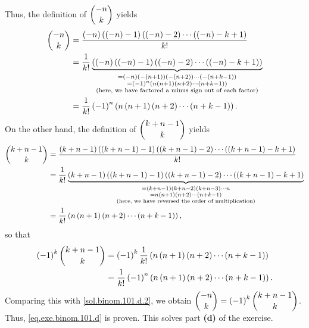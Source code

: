 \documentclass[paper=a4, fontsize=12pt]{scrartcl} %
\newcommand{\tup}[1]{\left( #1 \right)}
\newcommand{\underbrack}[2]{\underbrace{#1}_{\substack{#2}}}
\theoremstyle{plainsl}
\theoremstyle{definition}
\theoremstyle{remark}
\begin{document}
Thus, the definition of $\dbinom{-n}{k}$ yields
\begin{align}
   \dbinom{-n}{k}
&= \dfrac{ \tup{-n} \tup{\tup{-n}-1} \tup{\tup{-n}-2} \cdots \tup{\tup{-n}-k+1} }{k!} \nonumber\\
&= \dfrac{1}{k!}
    \underbrack{\tup{ \tup{-n} \tup{\tup{-n}-1} \tup{\tup{-n}-2} \cdots \tup{\tup{-n}-k+1} }}
               {= \tup{-n} \tup{-\tup{n+1}} \tup{-\tup{n+2}} \cdots \tup{-\tup{n+k-1}} \\
                = \tup{-1}^n \tup{ n \tup{n+1} \tup{n+2} \cdots \tup{n+k-1} } \\
                \text{(here, we have factored a minus sign out of each factor)}} \nonumber \\
&= \dfrac{1}{k!} \tup{-1}^n \tup{ n \tup{n+1} \tup{n+2} \cdots \tup{n+k-1} }.
\label{sol.binom.101.d.2}
\end{align}
On the other hand, the definition of $\dbinom{k + n - 1}{k}$ yields
\begin{align*}
   \dbinom{k + n - 1}{k}
&= \dfrac{ \tup{k+n-1} \tup{\tup{k+n-1}-1} \tup{\tup{k+n-1}-2} \cdots \tup{\tup{k+n-1}-k+1} }{k!} \\
&= \dfrac{1}{k!}
    \underbrack{ \tup{k+n-1} \tup{\tup{k+n-1}-1} \tup{\tup{k+n-1}-2} \cdots \tup{\tup{k+n-1}-k+1} }
               {= \tup{k+n-1} \tup{k+n-2} \tup{k+n-3} \cdots n \\
                = n \tup{n+1} \tup{n+2} \cdots \tup{n+k-1} \\
                \text{(here, we have reversed the order of multiplication)}} \\
&= \dfrac{1}{k!} \tup{ n \tup{n+1} \tup{n+2} \cdots \tup{n+k-1} } ,
\end{align*}
so that
\begin{align*}
   \tup{-1}^k \dbinom{k + n - 1}{k}
&= \tup{-1}^k \dfrac{1}{k!} \tup{ n \tup{n+1} \tup{n+2} \cdots \tup{n+k-1} } \\
&= \dfrac{1}{k!} \tup{-1}^n \tup{ n \tup{n+1} \tup{n+2} \cdots \tup{n+k-1} }.
\end{align*}
Comparing this with \eqref{sol.binom.101.d.2}, we obtain
$\dbinom{-n}{k} = \tup{-1}^k \dbinom{k + n - 1}{k}$.
Thus, \eqref{eq.exe.binom.101.d} is proven.
This solves part \textbf{(d)} of the exercise.

\vspace{0.8pc}
\end{document}
